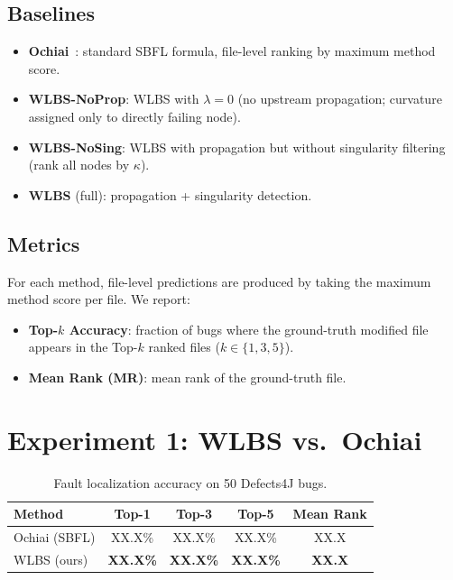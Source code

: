 \documentclass[acmtog]{acmart}
\begin{document}
\subsection{Baselines}
\begin{itemize}
  \item \textbf{Ochiai}~\cite{abreu2007accuracy}: standard SBFL formula, file-level
        ranking by maximum method score.
  \item \textbf{WLBS-NoProp}: WLBS with $\lambda=0$ (no upstream propagation;
        curvature assigned only to directly failing node).
  \item \textbf{WLBS-NoSing}: WLBS with propagation but without singularity
        filtering (rank all nodes by $\kappa$).
  \item \textbf{WLBS} (full): propagation + singularity detection.
\end{itemize}

\subsection{Metrics}
For each method, file-level predictions are produced by taking the maximum
method score per file. We report:
\begin{itemize}
  \item \textbf{Top-$k$ Accuracy}: fraction of bugs where the ground-truth
        modified file appears in the Top-$k$ ranked files ($k \in \{1,3,5\}$).
  \item \textbf{Mean Rank (MR)}: mean rank of the ground-truth file.
\end{itemize}

\section{Experiment 1: WLBS vs.~Ochiai}\label{sec:exp1}

\begin{table}[t]
\centering
\caption{Fault localization accuracy on 50 Defects4J bugs.}
\label{tab:exp1}
\begin{tabular}{lcccc}
\toprule
Method & Top-1 & Top-3 & Top-5 & Mean Rank \\
\midrule
Ochiai (SBFL) & XX.X\% & XX.X\% & XX.X\% & XX.X \\
WLBS (ours)   & \textbf{XX.X\%} & \textbf{XX.X\%} & \textbf{XX.X\%} & \textbf{XX.X} \\
\bottomrule
\end{tabular}
\end{table}
\end{document}
